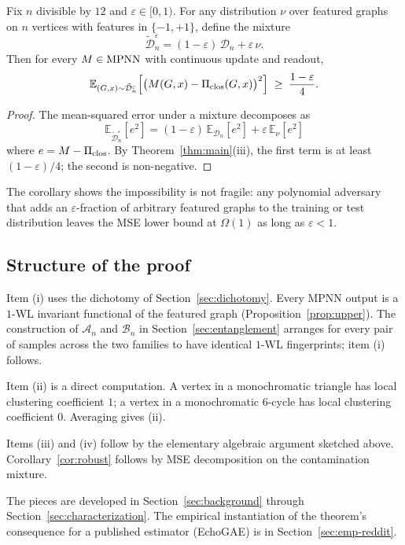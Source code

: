 \begin{corollary}[Robustness]\label{cor:robust}
Fix $n$ divisible by $12$ and $\varepsilon \in [0, 1)$. For any
distribution $\nu$ over featured graphs on $n$ vertices with
features in $\{-1, +1\}$, define the mixture
\[
\tilde{\mathcal{D}}_n^\varepsilon = (1 - \varepsilon)\, \mathcal{D}_n
+ \varepsilon\, \nu.
\]
Then for every $M \in \mathrm{MPNN}$ with continuous update and readout,
\[
\mathbb{E}_{(G, x) \sim \tilde{\mathcal{D}}_n^\varepsilon}\!\left[\bigl(M(G, x) - \Pi_{\mathrm{clos}}(G, x)\bigr)^2\right] \;\ge\; \frac{1 - \varepsilon}{4}.
\]
\end{corollary}

\begin{proof}
The mean-squared error under a mixture decomposes as
\[
\mathbb{E}_{\tilde{\mathcal{D}}_n^\varepsilon}[e^2] = (1 - \varepsilon)\,
\mathbb{E}_{\mathcal{D}_n}[e^2] + \varepsilon \, \mathbb{E}_{\nu}[e^2]
\]
where $e = M - \Pi_{\mathrm{clos}}$. By Theorem~\ref{thm:main}(iii), the first
term is at least $(1-\varepsilon)/4$; the second is non-negative.
\end{proof}

The corollary shows the impossibility is not fragile: any
polynomial adversary that adds an $\varepsilon$-fraction of
arbitrary featured graphs to the training or test distribution
leaves the MSE lower bound at $\Omega(1)$ as long as $\varepsilon <
1$.

\subsection{Structure of the proof}

Item (i) uses the dichotomy of Section~\ref{sec:dichotomy}. Every MPNN
output is a $1$-WL invariant functional of the featured graph
(Proposition~\ref{prop:upper}). The construction of $\mathcal{A}_n$ and
$\mathcal{B}_n$ in Section~\ref{sec:entanglement} arranges for every pair
of samples across the two families to have identical $1$-WL
fingerprints; item (i) follows.

Item (ii) is a direct computation. A vertex in a monochromatic
triangle has local clustering coefficient $1$; a vertex in a
monochromatic $6$-cycle has local clustering coefficient $0$.
Averaging gives (ii).

Items (iii) and (iv) follow by the elementary algebraic argument
sketched above. Corollary~\ref{cor:robust} follows by MSE decomposition on
the contamination mixture.

The pieces are developed in Section~\ref{sec:background} through
Section~\ref{sec:characterization}. The empirical instantiation of the
theorem's consequence for a published estimator (EchoGAE) is in
Section~\ref{sec:emp-reddit}.

